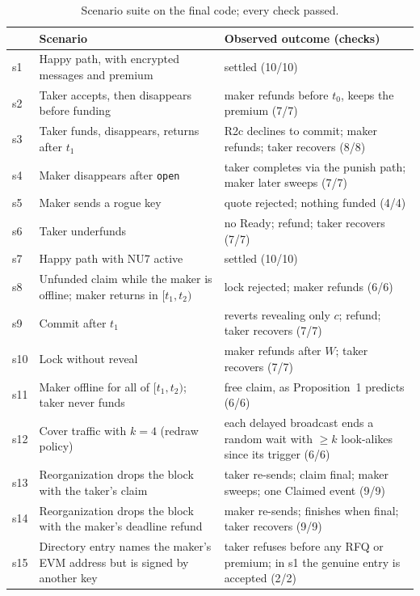 \documentclass[10pt,letterpaper]{article}
\theoremstyle{plain}
\theoremstyle{definition}
\newcommand{\fn}[1]{\texttt{#1}}
\begin{document}
\begin{table}[H]
\centering\small
\begin{tabularx}{\linewidth}{@{}l>{\raggedright\arraybackslash}X>{\raggedright\arraybackslash}X@{}}
\toprule
& \textbf{Scenario} & \textbf{Observed outcome (checks)}\\
\midrule
s1 & Happy path, with encrypted messages and premium & settled (10/10)\\
s2 & Taker accepts, then disappears before funding & maker refunds before $t_0$, keeps the premium (7/7)\\
s3 & Taker funds, disappears, returns after $t_1$ & R2c declines to commit; maker refunds; taker recovers (8/8)\\
s4 & Maker disappears after \fn{open} & taker completes via the punish path; maker later sweeps (7/7)\\
s5 & Maker sends a rogue key & quote rejected; nothing funded (4/4)\\
s6 & Taker underfunds & no Ready; refund; taker recovers (7/7)\\
s7 & Happy path with NU7 active & settled (10/10)\\
s8 & Unfunded claim while the maker is offline; maker returns in $[t_1,t_2)$ & lock rejected; maker refunds (6/6)\\
s9 & Commit after $t_1$ & reverts revealing only $c$; refund; taker recovers (7/7)\\
s10 & Lock without reveal & maker refunds after $W$; taker recovers (7/7)\\
s11 & Maker offline for all of $[t_1,t_2)$; taker never funds & free claim, as Proposition~1 predicts (6/6)\\
s12 & Cover traffic with $k=4$ (redraw policy) & each delayed broadcast ends a random wait with $\ge k$ look-alikes since its trigger (6/6)\\
s13 & Reorganization drops the block with the taker's claim & taker re-sends; claim final; maker sweeps; one Claimed event (9/9)\\
s14 & Reorganization drops the block with the maker's deadline refund & maker re-sends; finishes when final; taker recovers (9/9)\\
s15 & Directory entry names the maker's EVM address but is signed by another key & taker refuses before any RFQ or premium; in s1 the genuine entry is accepted (2/2)\\
\bottomrule
\end{tabularx}
\caption{Scenario suite on the final code; every check passed.}
\end{table}
\end{document}
